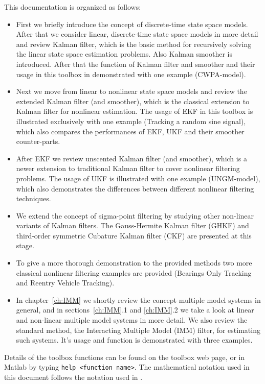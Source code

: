 This documentation is organized as follows: 
\begin{itemize}

\item First we briefly introduce the concept of discrete-time state
  space models. After that we consider linear, discrete-time state
  space models in more detail and review Kalman filter, which is the
  basic method for recursively solving the linear state space
  estimation problems. Also Kalman smoother is introduced. After that
  the function of Kalman filter and smoother and their usage in this
  toolbox in demonstrated with one example (CWPA-model).

\item Next we move from linear to nonlinear state space models and
  review the extended Kalman filter (and smoother), which is the
  classical extension to Kalman filter for nonlinear estimation. The
  usage of EKF in this toolbox is illustrated exclusively with one
  example (Tracking a random sine signal), which also compares the
  performances of EKF, UKF and their smoother counter-parts.

\item After EKF we review unscented Kalman filter (and smoother),
  which is a newer extension to traditional Kalman filter to cover
  nonlinear filtering problems. The usage of UKF is illustrated with
  one example (UNGM-model), which also demonstrates the differences
  between different nonlinear filtering techniques.

\item We extend the concept of sigma-point filtering by studying
  other non-linear variants of Kalman filters. The Gauss-Hermite
  Kalman filter (GHKF) and third-order symmetric Cubature Kalman
  filter (CKF) are presented at this stage.

\item To give a more thorough demonstration to the provided methods
  two more classical nonlinear filtering examples are provided
  (Bearings Only Tracking and Reentry Vehicle Tracking).

\item In chapter~\ref{ch:IMM} we shortly review the concept multiple model
  systems in general, and in sections~\ref{ch:IMM}.1 and \ref{ch:IMM}.2 we take a look at
  linear and non-linear multiple model systems in more detail. We also
  review the standard method, the Interacting Multiple Model (IMM)
  filter, for estimating such systems. It's usage and function is
  demonstrated with three examples.


\end{itemize}

Details of the toolbox functions can be found on the toolbox web page, or in
Matlab by typing \texttt{help <function name>}. The mathematical notation used in this document follows the notation used in \citep{Sarkka:2006}.



